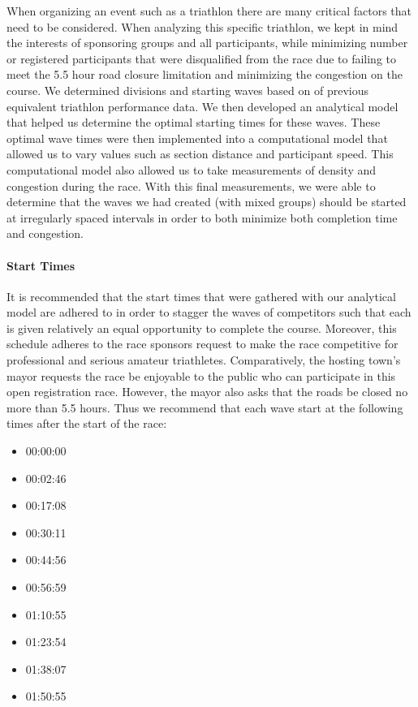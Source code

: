 \documentclass[12pt]{article}
\begin{document}
When organizing an event such as a triathlon there are many critical factors that need to be considered. When analyzing this specific triathlon, we kept in mind the interests of sponsoring groups and all participants, while minimizing number or registered participants that were disqualified from the race due to failing to meet the 5.5 hour road closure limitation and minimizing the congestion on the course. We determined divisions and starting waves based on of previous equivalent triathlon performance data. We then developed an analytical model that helped us determine the optimal starting times for these waves. These optimal wave times were then implemented into a computational model that allowed us to vary values such as section distance and participant speed. This computational model also allowed us to take measurements of density and congestion during the race. With this final measurements, we were able to determine that the waves we had created (with mixed groups) should be started at irregularly spaced intervals in order to both minimize both completion time and congestion.

\paragraph{Start Times}
It is recommended that the start times that were gathered with our analytical model are adhered to in order to stagger the waves of competitors such that each is given relatively an equal opportunity to complete the course. Moreover, this schedule adheres to the race sponsors request to make the race competitive for professional and serious amateur triathletes. Comparatively, the hosting town's mayor requests the race be enjoyable to the public who can participate in this open registration race. However, the mayor also asks that the roads be closed no more than 5.5 hours. Thus we recommend that each wave start at the following times after the start of the race:
\begin{itemize}
  \item 00:00:00
  \item 00:02:46
  \item 00:17:08
  \item 00:30:11
  \item 00:44:56
  \item 00:56:59
  \item 01:10:55
  \item 01:23:54
  \item 01:38:07
  \item 01:50:55
\end{itemize}
\end{document}
